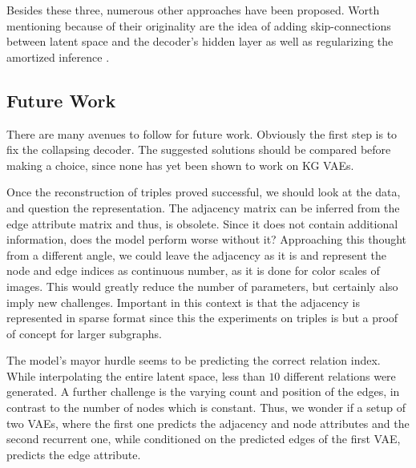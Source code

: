 



Besides these three, numerous other approaches have been proposed. Worth mentioning because of their originality are the idea of adding skip-connections between latent space and the decoder's hidden layer \cite{dieng_avoiding_2019} as well as regularizing the amortized inference \cite{shu_amortized_2019}.  







\subsection{Future Work}

There are many avenues to follow for future work. Obviously the first step is to fix the collapsing decoder. The suggested solutions should be compared before making a choice, since none has yet been shown to work on KG VAEs.

Once the reconstruction of triples proved successful, we should look at the data, and question the representation. The adjacency matrix can be inferred from the edge attribute matrix and thus, is obsolete. Since it does not contain additional information, does the model perform worse without it? Approaching this thought from a different angle, we could leave the adjacency as it is and represent the node and edge indices as continuous number, as it is done for color scales of images. This would greatly reduce the number of parameters, but certainly also imply new challenges. Important in this context is that the adjacency is represented in sparse format since this the experiments on triples is but a proof of concept for larger subgraphs. 

The model's mayor hurdle seems to be predicting the correct relation index. While interpolating the entire latent space, less than $10$ different relations were generated. A further challenge is the varying count and position of the edges, in contrast to the number of nodes which is constant. Thus, we wonder if a setup of two VAEs, where the first one predicts the adjacency and node attributes and the second recurrent one, while conditioned on the predicted edges of the first VAE, predicts the edge attribute.

